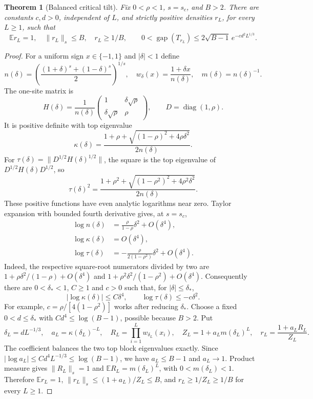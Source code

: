 \documentclass[11pt]{article}
\newtheorem{theorem}{Theorem}
\newcommand{\diag}{\operatorname{diag}}
\newcommand{\gap}{\operatorname{gap}}
\begin{document}
\begin{theorem}[Balanced critical tilt]\label{thm:critical-large}
Fix $0<\rho<1$, $s=s_c$, and $B>2$. There are constants $c,d>0$,
independent of $L$, and strictly positive densities $r_L$, for every $L\ge1$,
such that
\[
 \mathbb E r_L=1,\quad\|r_L\|_s\le B,\quad r_L\ge1/B,
 \qquad
 0<\gap(T_{r_L})\le2\sqrt{B-1}\,e^{-cd^2L^{1/3}}.
\]
\end{theorem}
\begin{proof}
For a uniform sign $x\in\{-1,1\}$ and $|\delta|<1$ define
\[
 n(\delta)=\left(\frac{(1+\delta)^s+(1-\delta)^s}{2}\right)^{1/s},
 \quad w_\delta(x)=\frac{1+\delta x}{n(\delta)},\quad
 m(\delta)=n(\delta)^{-1}.
\]
The one-site matrix is
\[
 H(\delta)=\frac1{n(\delta)}
 \begin{pmatrix}1&\delta\sqrt\rho\\\delta\sqrt\rho&\rho\end{pmatrix},
 \qquad D=\diag(1,\rho).
\]
It is positive definite with top eigenvalue
\[
 \kappa(\delta)=
 \frac{1+\rho+\sqrt{(1-\rho)^2+4\rho\delta^2}}{2n(\delta)}.
\]
For $\tau(\delta)=\|D^{1/2}H(\delta)^{1/2}\|$, the square is the
top eigenvalue of $D^{1/2}H(\delta)D^{1/2}$, so
\[
 \tau(\delta)^2=
 \frac{1+\rho^2+\sqrt{(1-\rho^2)^2+4\rho^2\delta^2}}{2n(\delta)}.
\]
These positive functions have even analytic logarithms near zero.
Taylor expansion with bounded fourth derivative gives, at $s=s_c$,
\begin{align*}
 \log n(\delta)&=\frac{\rho}{1-\rho}\delta^2+O(\delta^4),\\
 \log\kappa(\delta)&=O(\delta^4),\\
 \log\tau(\delta)&=-\frac{\rho}{2(1-\rho^2)}\delta^2+O(\delta^4).
\end{align*}
Indeed, the respective square-root numerators divided by two are
$1+\rho\delta^2/(1-\rho)+O(\delta^4)$ and
$1+\rho^2\delta^2/(1-\rho^2)+O(\delta^4)$.
Consequently there are $0<\delta_*<1$, $C\ge1$ and $c>0$ such that,
for $|\delta|\le\delta_*$,
\[
 |\log\kappa(\delta)|\le C\delta^4,
 \qquad\log\tau(\delta)\le-c\delta^2.
\]
For example, $c=\rho/[4(1-\rho^2)]$ works after reducing $\delta_*$.
Choose a fixed $0<d\le\delta_*$ with $Cd^4\le\log(B-1)$, possible
because $B>2$. Put
\[
 \delta_L=dL^{-1/3},\quad a_L=\kappa(\delta_L)^{-L},\quad
 R_L=\prod_{i=1}^Lw_{\delta_L}(x_i),\quad
 Z_L=1+a_Lm(\delta_L)^L,\quad r_L=\frac{1+a_LR_L}{Z_L}.
\]
The coefficient balances the two top block eigenvalues exactly.
Since $|\log a_L|\le Cd^4L^{-1/3}\le\log(B-1)$,
we have $a_L\le B-1$ and $a_L\to1$.
Product measure gives $\|R_L\|_s=1$ and
$\mathbb ER_L=m(\delta_L)^L$, with $0<m(\delta_L)<1$.
Therefore $\mathbb Er_L=1$, $\|r_L\|_s\le(1+a_L)/Z_L\le B$,
and $r_L\ge1/Z_L\ge1/B$ for every $L\ge1$.


\end{proof}
\end{document}
